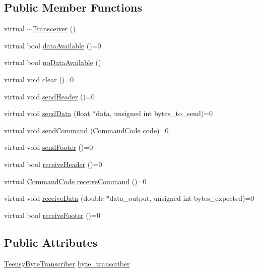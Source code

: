 \subsection*{Public Member Functions}
\begin{DoxyCompactItemize}
\item 
virtual \hyperlink{classTransceiver_a09118fef519a75434a3f42ab7d506c74}{$\sim$\+Transceiver} ()
\item 
virtual bool \hyperlink{classTransceiver_aece8d7151d91e85bc533441e5caed25a}{data\+Available} ()=0
\item 
virtual bool \hyperlink{classTransceiver_aabcf6a5a9d56fbef4cf3d9be3be3b9b9}{no\+Data\+Available} ()
\item 
virtual void \hyperlink{classTransceiver_a86e4f870849c74d7c67e4a559e5e9d10}{clear} ()=0
\item 
virtual void \hyperlink{classTransceiver_ac4c790e133ca87798ea38a35d0396105}{send\+Header} ()=0
\item 
virtual void \hyperlink{classTransceiver_a597e59205417428746fd2f5ec9888b29}{send\+Data} (float $\ast$data, unsigned int bytes\+\_\+to\+\_\+send)=0
\item 
virtual void \hyperlink{classTransceiver_ac44613ebe7fb8206a9dcdf5b2c359619}{send\+Command} (\hyperlink{Command__Codes_8hpp_a59210a0ae0b431bbcaba126ab960fd62}{Command\+Code} code)=0
\item 
virtual void \hyperlink{classTransceiver_aca78daf93712abb87b88d347744e53a9}{send\+Footer} ()=0
\item 
virtual bool \hyperlink{classTransceiver_acf52c3cc19b7b2b984d11a4f0f281353}{receive\+Header} ()=0
\item 
virtual \hyperlink{Command__Codes_8hpp_a59210a0ae0b431bbcaba126ab960fd62}{Command\+Code} \hyperlink{classTransceiver_a59c31f15c1ad4188b749778d543b491e}{receive\+Command} ()=0
\item 
virtual void \hyperlink{classTransceiver_a4513225fae13cf3ac2de65e951f8fc76}{receive\+Data} (double $\ast$data\+\_\+output, unsigned int bytes\+\_\+expected)=0
\item 
virtual bool \hyperlink{classTransceiver_af5c8b793da6d9af8a2e7da1a235a1883}{receive\+Footer} ()=0
\end{DoxyCompactItemize}
\subsection*{Public Attributes}
\begin{DoxyCompactItemize}
\item 
\hyperlink{classTeensyByteTranscriber}{Teensy\+Byte\+Transcriber} \hyperlink{classTransceiver_a126dcfc63c0a937fc758c5c464d3e36a}{byte\+\_\+transcriber}
\end{DoxyCompactItemize}


